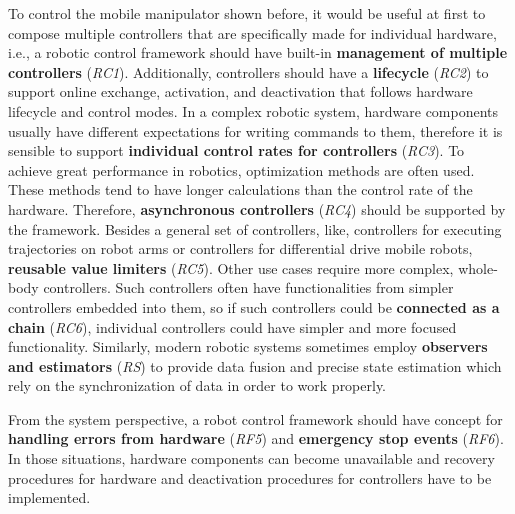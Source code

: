 \documentclass[journal]{IEEEtran}
\begin{document}
To control the mobile manipulator shown before, it would be useful at first to compose multiple controllers that are specifically made for individual hardware, i.e., a robotic control framework should have built-in \textbf{management of multiple controllers} (\emph{RC1}).
Additionally, controllers should have a \textbf{lifecycle} (\emph{RC2}) to support online exchange, activation, and deactivation that follows hardware lifecycle and control modes.
In a complex robotic system, hardware components usually have different expectations for writing commands to them, therefore it is sensible to support \textbf{individual control rates for controllers} (\emph{RC3}).
To achieve great performance in robotics, optimization methods are often used.
These methods tend to have longer calculations than the control rate of the hardware.
Therefore, \textbf{asynchronous controllers} (\emph{RC4}) should be supported by the framework.
Besides a general set of controllers, like, controllers for executing trajectories on robot arms or controllers for differential drive mobile robots, \textbf{reusable value limiters} (\emph{RC5}).
Other use cases require more complex, whole-body controllers.
Such controllers often have functionalities from simpler controllers embedded into them, so if such controllers could be \textbf{connected as a chain} (\emph{RC6}), individual controllers could have simpler and more focused functionality.
Similarly, modern robotic systems sometimes employ \textbf{observers and estimators} (\emph{RS}) to provide data fusion and precise state estimation which rely on the synchronization of data in order to work properly.

From the system perspective, a robot control framework should have concept for \textbf{handling errors from hardware} (\emph{RF5}) and \textbf{emergency stop events} (\emph{RF6}). In those situations, hardware components can become unavailable and recovery procedures for hardware and deactivation procedures for controllers have to be implemented.

\end{document}
